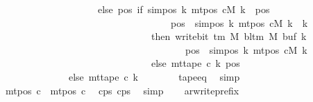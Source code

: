 \begin{isabellebody}
\ \ \ \ \ \ \ \ \ \ \ \ \ \ \ \ \ \ \ \ else\ {\isacharparenleft}{\kern0pt}{\isasymlambda}pos{\isachardot}{\kern0pt}\ if\ sim{\isacharunderscore}{\kern0pt}pos\ {\isacharquery}{\kern0pt}k\ {\isacharparenleft}{\kern0pt}mt{\isacharunderscore}{\kern0pt}pos\ cM\ k{\isacharparenright}{\kern0pt}\ {\isasymle}\ pos\isanewline
\ \ \ \ \ \ \ \ \ \ \ \ \ \ \ \ \ \ \ \ \ \ \ \ \ \ \ \ \ \ \ \ \ \ {\isasymand}\ pos\ {\isacharless}{\kern0pt}\ sim{\isacharunderscore}{\kern0pt}pos\ {\isacharquery}{\kern0pt}k\ {\isacharparenleft}{\kern0pt}mt{\isacharunderscore}{\kern0pt}pos\ cM\ k{\isacharparenright}{\kern0pt}\ {\isacharplus}{\kern0pt}\ {\isacharquery}{\kern0pt}k\isanewline
\ \ \ \ \ \ \ \ \ \ \ \ \ \ \ \ \ \ \ \ \ \ \ \ \ \ \ \ \ \ \ then\ write{\isacharunderscore}{\kern0pt}bit\ {\isacharparenleft}{\kern0pt}{\isasymGamma}{\isacharunderscore}{\kern0pt}tm\ M{\isacharparenright}{\kern0pt}\ {\isacharparenleft}{\kern0pt}bl{\isacharunderscore}{\kern0pt}tm\ M{\isacharparenright}{\kern0pt}\ {\isacharparenleft}{\kern0pt}buf\ k{\isacharparenright}{\kern0pt}\isanewline
\ \ \ \ \ \ \ \ \ \ \ \ \ \ \ \ \ \ \ \ \ \ \ \ \ \ \ \ \ \ \ \ \ \ \ \ \ \ {\isacharparenleft}{\kern0pt}pos\ {\isacharminus}{\kern0pt}\ sim{\isacharunderscore}{\kern0pt}pos\ {\isacharquery}{\kern0pt}k\ {\isacharparenleft}{\kern0pt}mt{\isacharunderscore}{\kern0pt}pos\ cM\ k{\isacharparenright}{\kern0pt}{\isacharparenright}{\kern0pt}\isanewline
\ \ \ \ \ \ \ \ \ \ \ \ \ \ \ \ \ \ \ \ \ \ \ \ \ \ \ \ \ \ \ else\ mt{\isacharunderscore}{\kern0pt}tape\ c{}\ k\ pos{\isacharparenright}{\kern0pt}{\isacharparenright}{\kern0pt}\isanewline
\ \ \ \ \ \ \ \ \ \ \ \ \ \ else\ mt{\isacharunderscore}{\kern0pt}tape\ c{}\ k{\isacharparenright}{\kern0pt}{\isachardoublequoteclose}\isanewline
\ \ \ \ \ \ \isamarkupfalse%
\ tape{\isacharunderscore}{\kern0pt}eq\ \isamarkupfalse%
\ simp\isanewline
\ \ \ \ \isamarkupfalse%
\ {\isachardoublequoteopen}mt{\isacharunderscore}{\kern0pt}pos\ c{\isacharprime}{\kern0pt}\ {\isacharequal}{\kern0pt}\ mt{\isacharunderscore}{\kern0pt}pos\ c{}{\isachardoublequoteclose}\ \isamarkupfalse%
\ c{\isacharprime}{\kern0pt}{\isacharunderscore}{\kern0pt}ps\ c{\isacharunderscore}{\kern0pt}ps\ \isamarkupfalse%
\ simp\isanewline
\ \ \isamarkupfalse%
\isanewline
{}\isamarkupfalse%
%
\endisatagproof
{\isafoldproof}%
%
\isadelimproof
\isanewline
%
\endisadelimproof
\isanewline
{}\isamarkupfalse%
\ ar{\isacharunderscore}{\kern0pt}write{\isacharunderscore}{\kern0pt}prefix{\isacharcolon}{\kern0pt}\isanewline

\end{isabellebody}
